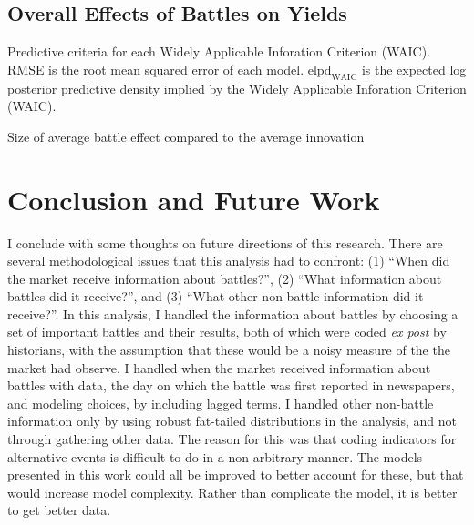 \subsection{Overall Effects of Battles on Yields}
\label{sec:over-effects-battl}


\begin{table}[!htpb]
  \centering
  
  \caption{
    Predictive criteria for each Widely Applicable Inforation Criterion (WAIC).
    RMSE is the root mean squared error of each model.
    $\text{elpd}_{\text{WAIC}}$ is the expected log posterior predictive density implied by the Widely Applicable Inforation Criterion (WAIC).
  }
  \label{bonds:tab:waic}
\end{table}

\begin{table}[!htpb]
  \centering
  
  \caption{Size of average battle effect compared to the average innovation}
\end{table}






\section{Conclusion and Future Work}
\label{sec:conclusion}


I conclude with some thoughts on future directions of this research.
There are several methodological issues that this analysis had to confront: (1) ``When did the market receive information about battles?'', (2) ``What information about battles did it receive?'', and (3) ``What other non-battle information did it receive?''.
In this analysis, I handled the information about battles by choosing a set of important battles and their results, both of which were coded \textit{ex post} by historians,  with the assumption that these would be a noisy measure of the the market had observe.
I handled when the market received information about battles with data, the day on which the battle was first reported in newspapers, and modeling choices, by including lagged terms.
I handled other non-battle information only by using robust fat-tailed distributions in the analysis, and not through gathering other data.
The reason for this was that coding indicators for alternative events is difficult to do in a non-arbitrary manner.
The models presented in this work could all be improved to better account for these, but that would increase model complexity.
Rather than complicate the model, it is better to get better data.

